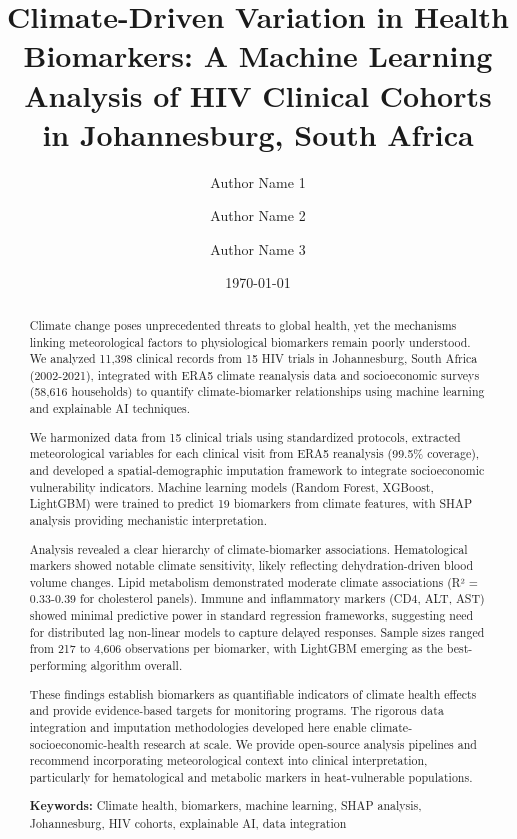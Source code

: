 \documentclass[11pt,a4paper]{article}
\title{Climate-Driven Variation in Health Biomarkers: A Machine Learning Analysis of HIV Clinical Cohorts in Johannesburg, South Africa}
\author[1]{Author Name 1}
\author[1,2]{Author Name 2}
\author[3]{Author Name 3}
\affil[1]{Department/Institution 1}
\affil[2]{Department/Institution 2}
\affil[3]{Department/Institution 3}
\date{\today}
\begin{document}
\maketitle

\begin{abstract}
Climate change poses unprecedented threats to global health, yet the mechanisms linking meteorological factors to physiological biomarkers remain poorly understood. We analyzed 11,398 clinical records from 15 HIV trials in Johannesburg, South Africa (2002-2021), integrated with ERA5 climate reanalysis data and socioeconomic surveys (58,616 households) to quantify climate-biomarker relationships using machine learning and explainable AI techniques.

We harmonized data from 15 clinical trials using standardized protocols, extracted meteorological variables for each clinical visit from ERA5 reanalysis (99.5\% coverage), and developed a spatial-demographic imputation framework to integrate socioeconomic vulnerability indicators. Machine learning models (Random Forest, XGBoost, LightGBM) were trained to predict 19 biomarkers from climate features, with SHAP analysis providing mechanistic interpretation.

Analysis revealed a clear hierarchy of climate-biomarker associations. Hematological markers showed notable climate sensitivity, likely reflecting dehydration-driven blood volume changes. Lipid metabolism demonstrated moderate climate associations (R² = 0.33-0.39 for cholesterol panels). Immune and inflammatory markers (CD4, ALT, AST) showed minimal predictive power in standard regression frameworks, suggesting need for distributed lag non-linear models to capture delayed responses. Sample sizes ranged from 217 to 4,606 observations per biomarker, with LightGBM emerging as the best-performing algorithm overall.

These findings establish biomarkers as quantifiable indicators of climate health effects and provide evidence-based targets for monitoring programs. The rigorous data integration and imputation methodologies developed here enable climate-socioeconomic-health research at scale. We provide open-source analysis pipelines and recommend incorporating meteorological context into clinical interpretation, particularly for hematological and metabolic markers in heat-vulnerable populations.

\textbf{Keywords:} Climate health, biomarkers, machine learning, SHAP analysis, Johannesburg, HIV cohorts, explainable AI, data integration
\end{abstract}
\end{document}

